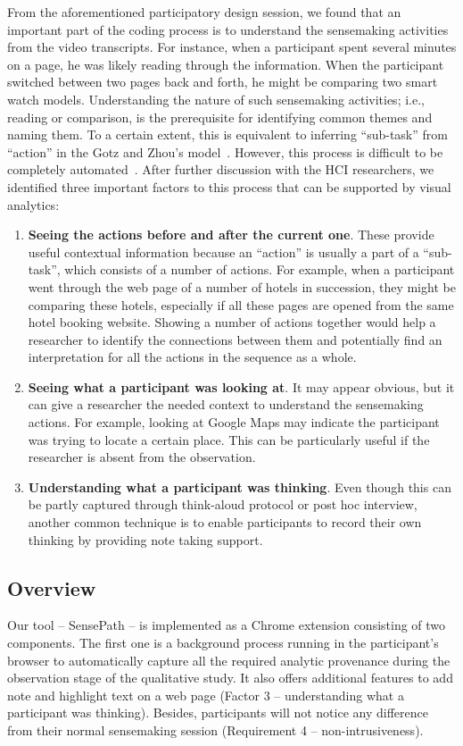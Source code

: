 From the aforementioned participatory design session, we found that an important part of the coding process is to understand the sensemaking activities from the video transcripts. For instance, when a participant spent several minutes on a page, he was likely reading through the information. When the participant switched between two pages back and forth, he might be comparing two smart watch models. Understanding the nature of such sensemaking activities; i.e., reading or comparison, is the prerequisite for identifying common themes and naming them. To a certain extent, this is equivalent to inferring ``sub-task'' from ``action'' in the Gotz and Zhou's model~\cite{Gotz2009}. However, this process is difficult to be completely automated~\cite{Dou2009}. After further discussion with the HCI researchers, we identified three important factors to this process that can be supported by visual analytics:
\begin{enumerate}
	\item \textbf{Seeing the actions before and after the current one}. These provide useful contextual information because an ``action'' is usually a part of a ``sub-task'', which consists of a number of actions. For example, when a participant went through the web page of a number of hotels in succession, they might be comparing these hotels, especially if all these pages are opened from the same hotel booking website. Showing a number of actions together would help a researcher to identify the connections between them and potentially find an interpretation for all the actions in the sequence as a whole.
	\item \textbf{Seeing what a participant was looking at}. It may appear obvious, but it can give a researcher the needed context to understand the sensemaking actions. For example, looking at Google Maps may indicate the participant was trying to locate a certain place. This can be particularly useful if the researcher is absent from the observation.
	\item \textbf{Understanding what a participant was thinking}. Even though this can be partly captured through think-aloud protocol or post hoc interview, another common technique is to enable participants to record their own thinking by providing note taking support.
\end{enumerate}

\subsection{Overview}
Our tool -- SensePath -- is implemented as a Chrome extension consisting of two components. The first one is a background process running in the participant's browser to automatically capture all the required analytic provenance during the observation stage of the qualitative study. It also offers additional features to add note and highlight text on a web page (Factor 3 -- understanding what a participant was thinking). Besides, participants will not notice any difference from their normal sensemaking session (Requirement 4 -- non-intrusiveness).

